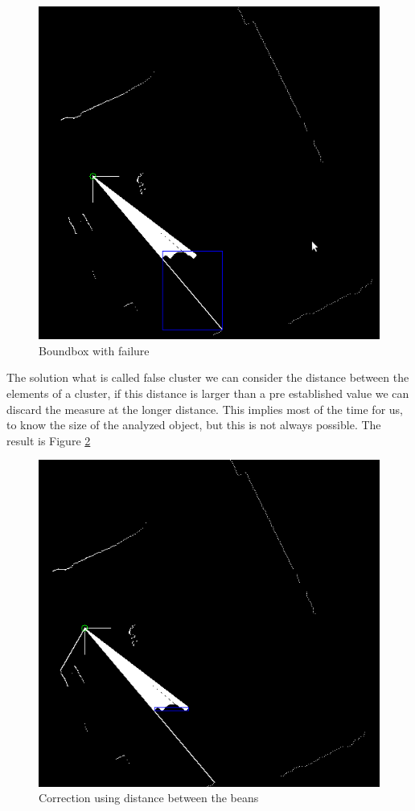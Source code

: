 \documentclass{article}
\begin{document}
\begin{figure}[H]
\includegraphics[scale=0.4]{image/boundbox02}
\caption{Boundbox with failure}
\label{fig:boundbox02}
\end{figure}


The solution what is called false cluster we can consider the distance between the elements of a cluster, if this distance is larger than a pre established value we can discard the measure at the longer distance. This implies most of the time for us, to know the size of the analyzed object, but this is not always possible. The result is Figure \ref{fig:boundbox03}

\begin{figure}[H]
\includegraphics[scale=0.4]{image/boundbox03}
\caption{Correction using distance between the beans}
\label{fig:boundbox03}
\end{figure}
\end{document}

